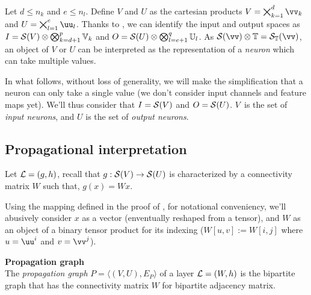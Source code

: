 Let $d \le n_k$ and $e \le n_l$. Define $V$ and $U$ as the cartesian products $V = \bigtimes_{k=1}^d \vv_k$ and $U = \bigtimes_{l=1}^e \uu_l$. Thanks to , we can identify the input and output spaces as $I = \mathcal{S}(V) \otimes \bigotimes_{k=d+1}^p \mathbb{V}_k$ and $O = \mathcal{S}(U) \otimes \bigotimes_{l=e+1}^q \mathbb{U}_l$. As $\cs(\vv) \otimes \bbt = \cs_{\bbt}(\vv)$, an object of $V$ or $U$ can be interpreted as the representation of a \emph{neuron} which can take multiple values.

\vspace{10pt}
In what follows, without loss of generality, we will make the simplification that a neuron can only take a single value (we don't consider input channels and feature maps yet). We'll thus consider that $I = \mathcal{S}(V)$ and $O = \mathcal{S}(U)$. $V$~is the set of \emph{input neurons}, and $U$ is the set of \emph{output neurons}.

\subsection{Propagational interpretation}

Let $\mathcal{L} = (g,h)$, recall that $g: \mathcal{S}(V) \rightarrow \mathcal{S}(U)$ is characterized by a connectivity matrix $W$ such that, $g(x) = Wx$.

\begin{remark}Using the mapping defined in the proof of , for notational conveniency, we'll abusively consider $x$ as a vector (enventually reshaped from a tensor), and $W$ as an object of a binary tensor product for its indexing (\ie $W[u,v] := W[i,j]$ where $u = \uu^i$ and $v = \vv^j$).
\end{remark}


\begin{definition}\textbf{Propagation graph}\\
The \emph{propagation graph} $P = \langle (V, U), E_P \rangle$ of a layer $\mathcal{L} = (W,h)$ is the bipartite graph that has the connectivity matrix $W$ for bipartite adjacency matrix.
\end{definition}


